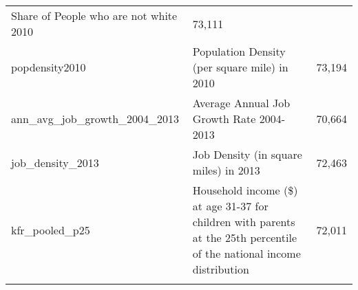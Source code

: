 \documentclass[]{book}
\begin{document}
\begin{longtable}[]{@{}lll@{}}
\begin{minipage}[t]{0.04\columnwidth}
Share of People who are not white 2010\strut
\end{minipage} & \begin{minipage}[t]{0.04\columnwidth}\raggedright\strut
73,111\strut
\end{minipage}\tabularnewline
\begin{minipage}[t]{0.04\columnwidth}\raggedright\strut
popdensity2010\strut
\end{minipage} & \begin{minipage}[t]{0.04\columnwidth}\raggedright\strut
Population Density (per square mile) in 2010\strut
\end{minipage} & \begin{minipage}[t]{0.04\columnwidth}\raggedright\strut
73,194\strut
\end{minipage}\tabularnewline
\begin{minipage}[t]{0.04\columnwidth}\raggedright\strut
ann\_avg\_job\_growth\_2004\_2013\strut
\end{minipage} & \begin{minipage}[t]{0.04\columnwidth}\raggedright\strut
Average Annual Job Growth Rate 2004-2013\strut
\end{minipage} & \begin{minipage}[t]{0.04\columnwidth}\raggedright\strut
70,664\strut
\end{minipage}\tabularnewline
\begin{minipage}[t]{0.04\columnwidth}\raggedright\strut
job\_density\_2013\strut
\end{minipage} & \begin{minipage}[t]{0.04\columnwidth}\raggedright\strut
Job Density (in square miles) in 2013\strut
\end{minipage} & \begin{minipage}[t]{0.04\columnwidth}\raggedright\strut
72,463\strut
\end{minipage}\tabularnewline
\begin{minipage}[t]{0.04\columnwidth}\raggedright\strut
kfr\_pooled\_p25\strut
\end{minipage} & \begin{minipage}[t]{0.04\columnwidth}\raggedright\strut
Household income (\$) at age 31-37 for children with parents at the 25th
percentile of the national income distribution\strut
\end{minipage} & \begin{minipage}[t]{0.04\columnwidth}\raggedright\strut
72,011\strut
\end{minipage}\tabularnewline
\begin{minipage}[t]{0.04\columnwidth}\raggedright\strut

\end{minipage}
\end{longtable}
\end{document}
